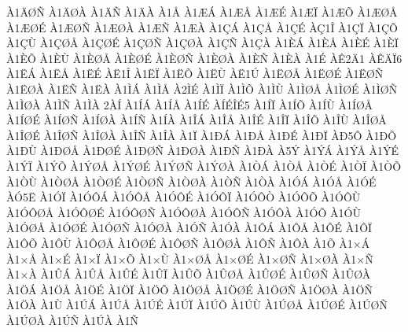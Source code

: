 {^^c01^^c4^^d8^^d1
^^c01^^c4^^d8^^c0
^^c01^^c4^^d1
^^c01^^c4^^c0
^^c01^^c5
^^c01^^c6^^c1
^^c01^^c6^^c5
^^c01^^c6^^c9
^^c01^^c6^^cf
^^c01^^c6^^d5
^^c01^^c6^^d8^^c5
^^c01^^c6^^d8^^c9
^^c01^^c6^^d8^^d1
^^c01^^c6^^d8^^c0
^^c01^^c6^^d1
^^c01^^c6^^c0
^^c01^^c7^^c1
^^c01^^c7^^c5
^^c01^^c7^^c9
^^c0^^c71^^ce
^^c01^^c7^^cf
^^c01^^c7^^d5
^^c01^^c7^^d9
^^c01^^c7^^d8^^c5
^^c01^^c7^^d8^^c9
^^c01^^c7^^d8^^d1
^^c01^^c7^^d8^^c0
^^c01^^c7^^d1
^^c01^^c7^^c0
^^c01^^c8^^c1
^^c01^^c8^^c5
^^c01^^c8^^c9
^^c01^^c8^^cf
^^c01^^c8^^d5
^^c01^^c8^^d9
^^c01^^c8^^d8^^c5
^^c01^^c8^^d8^^c9
^^c01^^c8^^d8^^d1
^^c01^^c8^^d8^^c0
^^c01^^c8^^d1
^^c01^^c8^^c0
^^c01^^c9
^^c0^^ca2^^c41
^^c0^^ca^^c4^^cf6
^^c01^^cb^^c1
^^c01^^cb^^c5
^^c01^^cb^^c9
^^c0^^cb1^^ce
^^c01^^cb^^cf
^^c01^^cb^^d5
^^c01^^cb^^d9
^^c0^^cb1^^da
^^c01^^cb^^d8^^c5
^^c01^^cb^^d8^^c9
^^c01^^cb^^d8^^d1
^^c01^^cb^^d8^^c0
^^c01^^cb^^d1
^^c01^^cb^^c0
^^c01^^cc^^c1
^^c01^^cc^^c5
^^c02^^cc^^c9
^^c01^^cc^^cf
^^c01^^cc^^d5
^^c01^^cc^^d9
^^c01^^cc^^d8^^c5
^^c01^^cc^^d8^^c9
^^c01^^cc^^d8^^d1
^^c01^^cc^^d8^^c0
^^c01^^cc^^d1
^^c01^^cc^^c0
2^^c0^^cd
^^c01^^cd^^c1
^^c01^^cd^^c5
^^c01^^cd^^c9
^^c0^^cd^^c9^^ce^^c95
^^c01^^cd^^cf
^^c01^^cd^^d5
^^c01^^cd^^d9
^^c01^^cd^^d8^^c5
^^c01^^cd^^d8^^c9
^^c01^^cd^^d8^^d1
^^c01^^cd^^d8^^c0
^^c01^^cd^^d1
^^c01^^cd^^c0
^^c01^^ce^^c1
^^c01^^ce^^c5
^^c01^^ce^^c9
^^c01^^ce^^cf
^^c01^^ce^^d5
^^c01^^ce^^d9
^^c01^^ce^^d8^^c5
^^c01^^ce^^d8^^c9
^^c01^^ce^^d8^^d1
^^c01^^ce^^d8^^c0
^^c01^^ce^^d1
^^c01^^ce^^c0
^^c01^^cf
^^c01^^d0^^c1
^^c01^^d0^^c5
^^c01^^d0^^c9
^^c01^^d0^^cf
^^c0^^d05^^d4
^^c01^^d0^^d5
^^c01^^d0^^d9
^^c01^^d0^^d8^^c5
^^c01^^d0^^d8^^c9
^^c01^^d0^^d8^^d1
^^c01^^d0^^d8^^c0
^^c01^^d0^^d1
^^c01^^d0^^c0
^^c05^^dd
^^c01^^dd^^c1
^^c01^^dd^^c5
^^c01^^dd^^c9
^^c01^^dd^^cf
^^c01^^dd^^d5
^^c01^^dd^^d8^^c5
^^c01^^dd^^d8^^c9
^^c01^^dd^^d8^^d1
^^c01^^dd^^d8^^c0
^^c01^^d2^^c1
^^c01^^d2^^c5
^^c01^^d2^^c9
^^c01^^d2^^cf
^^c01^^d2^^d5
^^c01^^d2^^d9
^^c01^^d2^^d8^^c5
^^c01^^d2^^d8^^c9
^^c01^^d2^^d8^^d1
^^c01^^d2^^d8^^c0
^^c01^^d2^^d1
^^c01^^d2^^c0
^^c01^^d3^^c1
^^c01^^d3^^c5
^^c01^^d3^^c9
^^c0^^d35^^cb
^^c01^^d3^^cf
^^c01^^d3^^d4^^c1
^^c01^^d3^^d4^^c5
^^c01^^d3^^d4^^c9
^^c01^^d3^^d4^^cf
^^c01^^d3^^d4^^d2
^^c01^^d3^^d4^^d5
^^c01^^d3^^d4^^d9
^^c01^^d3^^d4^^d8^^c5
^^c01^^d3^^d4^^d8^^c9
^^c01^^d3^^d4^^d8^^d1
^^c01^^d3^^d4^^d8^^c0
^^c01^^d3^^d4^^d1
^^c01^^d3^^d4^^c0
^^c01^^d3^^d5
^^c01^^d3^^d9
^^c01^^d3^^d8^^c5
^^c01^^d3^^d8^^c9
^^c01^^d3^^d8^^d1
^^c01^^d3^^d8^^c0
^^c01^^d3^^d1
^^c01^^d3^^c0
^^c01^^d4^^c1
^^c01^^d4^^c5
^^c01^^d4^^c9
^^c01^^d4^^cf
^^c01^^d4^^d5
^^c01^^d4^^d9
^^c01^^d4^^d8^^c5
^^c01^^d4^^d8^^c9
^^c01^^d4^^d8^^d1
^^c01^^d4^^d8^^c0
^^c01^^d4^^d1
^^c01^^d4^^c0
^^c01^^d5
^^c01^^d7^^c1
^^c01^^d7^^c5
^^c01^^d7^^c9
^^c01^^d7^^cf
^^c01^^d7^^d5
^^c01^^d7^^d9
^^c01^^d7^^d8^^c5
^^c01^^d7^^d8^^c9
^^c01^^d7^^d8^^d1
^^c01^^d7^^d8^^c0
^^c01^^d7^^d1
^^c01^^d7^^c0
^^c01^^db^^c1
^^c01^^db^^c5
^^c01^^db^^c9
^^c01^^db^^cf
^^c01^^db^^d5
^^c01^^db^^d8^^c5
^^c01^^db^^d8^^c9
^^c01^^db^^d8^^d1
^^c01^^db^^d8^^c0
^^c01^^d6^^c1
^^c01^^d6^^c5
^^c01^^d6^^c9
^^c01^^d6^^cf
^^c01^^d6^^d5
^^c01^^d6^^d8^^c5
^^c01^^d6^^d8^^c9
^^c01^^d6^^d8^^d1
^^c01^^d6^^d8^^c0
^^c01^^d6^^d1
^^c01^^d6^^c0
^^c01^^d9
^^c01^^da^^c1
^^c01^^da^^c5
^^c01^^da^^c9
^^c01^^da^^cf
^^c01^^da^^d5
^^c01^^da^^d9
^^c01^^da^^d8^^c5
^^c01^^da^^d8^^c9
^^c01^^da^^d8^^d1
^^c01^^da^^d8^^c0
^^c01^^da^^d1
^^c01^^da^^c0
^^c01^^d1
}
